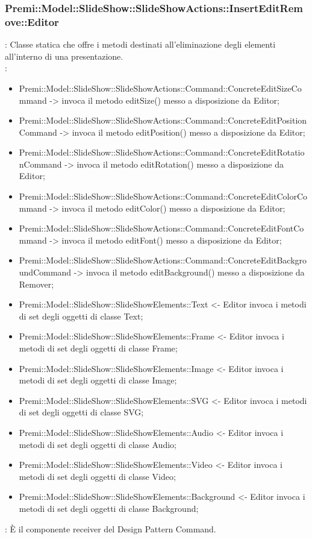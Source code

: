 		\subsubsection{Premi::Model::SlideShow::SlideShowActions::InsertEditRemove::Editor}{
			\textbf{\tipo}: Classe statica che offre i metodi destinati all'eliminazione degli elementi all’interno di una presentazione.\\	
			\textbf{\relaz}:
			\begin{itemize}
				\item Premi::Model::SlideShow::SlideShowActions::Command::ConcreteEditSizeCommand -> invoca il metodo editSize() messo a disposizione da Editor;
				\item Premi::Model::SlideShow::SlideShowActions::Command::ConcreteEditPositionCommand -> invoca il metodo editPosition() messo a disposizione da Editor;
				\item Premi::Model::SlideShow::SlideShowActions::Command::ConcreteEditRotationCommand -> invoca il metodo editRotation() messo a disposizione da Editor;
				\item Premi::Model::SlideShow::SlideShowActions::Command::ConcreteEditColorCommand -> invoca il metodo editColor() messo a disposizione da Editor;
				\item Premi::Model::SlideShow::SlideShowActions::Command::ConcreteEditFontCommand -> invoca il metodo editFont() messo a disposizione da Editor;
				\item Premi::Model::SlideShow::SlideShowActions::Command::ConcreteEditBackgroundCommand -> invoca il metodo editBackground() messo a disposizione da Remover;
				
				\item Premi::Model::SlideShow::SlideShowElements::Text <- Editor invoca i metodi di set degli oggetti di classe Text;
				\item Premi::Model::SlideShow::SlideShowElements::Frame <- Editor invoca i metodi di set degli oggetti di classe Frame;
				\item Premi::Model::SlideShow::SlideShowElements::Image <- Editor invoca i metodi di set degli oggetti di classe Image;
				\item Premi::Model::SlideShow::SlideShowElements::SVG <- Editor invoca i metodi di set degli oggetti di classe SVG;
				\item Premi::Model::SlideShow::SlideShowElements::Audio <- Editor invoca i metodi di set degli oggetti di classe Audio;
				\item Premi::Model::SlideShow::SlideShowElements::Video <- Editor invoca i metodi di set degli oggetti di classe Video;
				\item Premi::Model::SlideShow::SlideShowElements::Background <- Editor invoca i metodi di set degli oggetti di classe Background;
			\end{itemize} 
			\textbf{\interfacce}: È il componente receiver del Design Pattern Command.\\
		}
